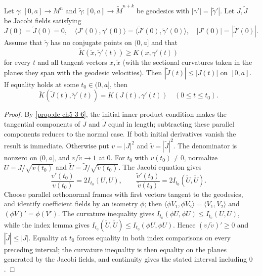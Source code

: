 \begin{theorem}
  \label{thm:dc-ch10-2-3}
  Let $\gamma:[0,a]\to M^n$ and $\tilde\gamma:[0,a]\to\widetilde M^{n+k}$ be
  geodesics with $|\gamma'|=|\tilde\gamma'|$. Let $J,\tilde J$ be Jacobi fields
  satisfying
  \[
  J(0)=\tilde J(0)=0,\quad
  \langle J'(0),\gamma'(0)\rangle=\langle\tilde J'(0),\tilde\gamma'(0)\rangle,
  \quad |J'(0)|=|\tilde J'(0)|.
  \]
  Assume that $\tilde\gamma$ has no conjugate points on $(0,a]$ and that
  \[
  \widetilde K(\tilde x,\tilde\gamma'(t))\geq K(x,\gamma'(t))
  \]
  for every $t$ and all tangent vectors $x,\tilde x$ (with the sectional
  curvatures taken in the planes they span with the geodesic velocities). Then
  $|\tilde J(t)|\leq |J(t)|$ on $[0,a]$. If equality holds at some
  $t_0\in(0,a]$, then
  \[
  \widetilde K(\tilde J(t),\tilde\gamma'(t))=K(J(t),\gamma'(t))
  \quad(0\leq t\leq t_0).
  \]
\end{theorem}
\begin{proof}
  \sketch
  By \cref{prop:dc-ch5-3-6}, the initial inner-product condition makes the
  tangential components of $J$ and $\tilde J$ equal in length; subtracting these
  parallel components reduces to the normal case. If both initial derivatives
  vanish the result is immediate. Otherwise put $v=|J|^2$ and
  $\tilde v=|\tilde J|^2$. The denominator is nonzero on $(0,a]$, and
  $v/\tilde v\to1$ at $0$. For $t_0$ with $v(t_0)\ne0$, normalize
  $U=J/\sqrt{v(t_0)}$ and $\tilde U=\tilde J/\sqrt{\tilde v(t_0)}$. The Jacobi
  equation gives
  \[
  \frac{v'(t_0)}{v(t_0)}=2I_{t_0}(U,U),\qquad
  \frac{\tilde v'(t_0)}{\tilde v(t_0)}=2I_{t_0}(\tilde U,\tilde U).
  \]
  Choose parallel orthonormal frames with first vectors tangent to the geodesics,
  and identify coefficient fields by an isometry $\phi$; then
  $\langle\phi V_1,\phi V_2\rangle=\langle V_1,V_2\rangle$ and
  $(\phi V)'=\phi(V')$. The curvature inequality gives
  $I_{t_0}(\phi U,\phi U)\leq I_{t_0}(U,U)$, while the index lemma gives
  $I_{t_0}(\tilde U,\tilde U)\leq I_{t_0}(\phi U,\phi U)$. Hence
  $(v/\tilde v)'\geq0$ and $|\tilde J|\leq|J|$. Equality at $t_0$ forces equality in
  both index comparisons on every preceding interval; the curvature inequality is
  then equality on the planes generated by the Jacobi fields, and continuity gives
  the stated interval including $0$.
\end{proof}

